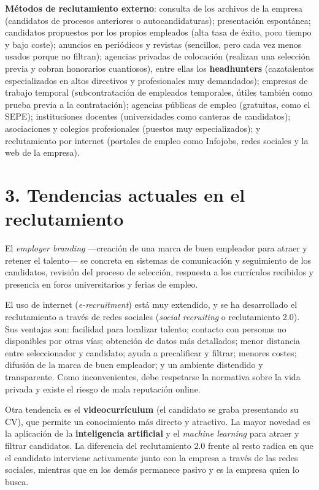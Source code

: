 \documentclass[12pt]{book} %
\begin{document}
\textbf{Métodos de reclutamiento externo}: consulta de los archivos de
la empresa (candidatos de procesos anteriores o autocandidaturas);
presentación espontánea; candidatos propuestos por los propios empleados
(alta tasa de éxito, poco tiempo y bajo coste); anuncios en periódicos y
revistas (sencillos, pero cada vez menos usados porque no filtran);
agencias privadas de colocación (realizan una selección previa y cobran
honorarios cuantiosos), entre ellas los \textbf{headhunters}
(cazatalentos especializados en altos directivos y profesionales muy
demandados); empresas de trabajo temporal (subcontratación de empleados
temporales, útiles también como prueba previa a la contratación);
agencias públicas de empleo (gratuitas, como el SEPE); instituciones
docentes (universidades como canteras de candidatos); asociaciones y
colegios profesionales (puestos muy especializados); y reclutamiento por
internet (portales de empleo como Infojobs, redes sociales y la web de
la empresa).

\hypertarget{tendencias-actuales-en-el-reclutamiento}{%
\section{3. Tendencias actuales en el
reclutamiento}\label{tendencias-actuales-en-el-reclutamiento}}

El \emph{employer branding} ---creación de una marca de buen empleador
para atraer y retener el talento--- se concreta en sistemas de
comunicación y seguimiento de los candidatos, revisión del proceso de
selección, respuesta a los currículos recibidos y presencia en foros
universitarios y ferias de empleo.

El uso de internet (\emph{e-recruitment}) está muy extendido, y se ha
desarrollado el reclutamiento a través de redes sociales (\emph{social
recruiting} o reclutamiento 2.0). Sus ventajas son: facilidad para
localizar talento; contacto con personas no disponibles por otras vías;
obtención de datos más detallados; menor distancia entre seleccionador y
candidato; ayuda a precalificar y filtrar; menores costes; difusión de
la marca de buen empleador; y un ambiente distendido y transparente.
Como inconvenientes, debe respetarse la normativa sobre la vida privada
y existe el riesgo de mala reputación online.

Otra tendencia es el \textbf{videocurrículum} (el candidato se graba
presentando su CV), que permite un conocimiento más directo y atractivo.
La mayor novedad es la aplicación de la \textbf{inteligencia artificial}
y el \emph{machine learning} para atraer y filtrar candidatos. La
diferencia del reclutamiento 2.0 frente al resto radica en que el
candidato interviene activamente junto con la empresa a través de las
redes sociales, mientras que en los demás permanece pasivo y es la
empresa quien lo busca.
\end{document}
